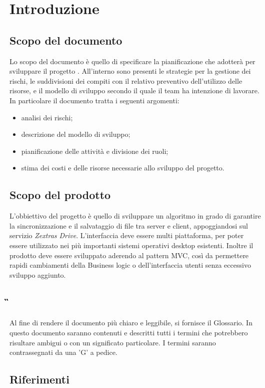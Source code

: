 \section{Introduzione}
\subsection{Scopo del documento}
Lo scopo del documento è quello di specificare la pianificazione che \Gruppo  adotterà per sviluppare il progetto \NomeProgetto. All'interno sono presenti le strategie per la gestione dei rischi, le suddivisioni dei compiti con il relativo preventivo dell'utilizzo delle risorse, e il modello di sviluppo secondo il quale il team ha intenzione di lavorare.
In particolare il documento tratta i seguenti argomenti:
\begin{itemize}
\item analisi dei rischi;
\item descrizione del modello di sviluppo;
\item pianificazione delle attività e divisione dei ruoli;
\item stima dei costi e delle risorse necessarie allo sviluppo del progetto.
\end{itemize}
\subsection{Scopo del prodotto}
L'obbiettivo del progetto è quello di sviluppare un algoritmo in grado di garantire la sincronizzazione e il salvataggio di file tra server e client, appoggiandosi sul servizio \textit{Zextras Drive}.
L'interfaccia deve essere multi piattaforma, per poter essere utilizzato nei più importanti sistemi operativi desktop esistenti.
Inoltre il prodotto deve essere sviluppato aderendo al pattern MVC, così da permettere rapidi cambiamenti della Business logic o dell'interfaccia utenti senza eccessivo sviluppo aggiunto.
\subsection{\G{}}
Al fine di rendere il documento più chiaro e leggibile, si fornisce il Glossario. In questo documento saranno contenuti e descritti tutti i termini che potrebbero risultare ambigui o con un significato particolare. I termini saranno contrassegnati da una 'G' a pedice.
\subsection{Riferimenti}
